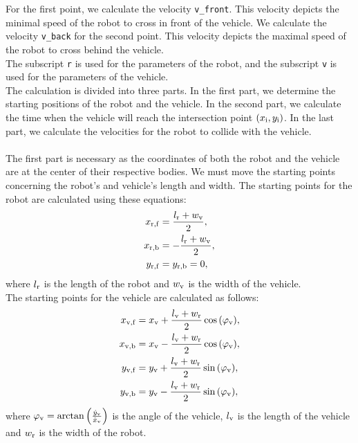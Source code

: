         \noindent For the first point, we calculate the velocity \texttt{v\_front}. This velocity depicts the minimal speed of the robot to cross in front of the vehicle. We calculate the velocity \texttt{v\_back} for the second point. This velocity depicts the maximal speed of the robot to cross behind the vehicle.\\
        The subscript \texttt{r} is used for the parameters of the robot, and the subscript \texttt{v} is used for the parameters of the vehicle.\\
        The calculation is divided into three parts. In the first part, we determine the starting positions of the robot and the vehicle. In the second part, we calculate the time when the vehicle will reach the intersection point $(x_{\rm{i}}, y_{\rm{i}})$. In the last part, we calculate the velocities for the robot to collide with the vehicle.\\\\
        The first part is necessary as the coordinates of both the robot and the vehicle are at the center of their respective bodies. We must move the starting points concerning the robot's and vehicle's length and width. The starting points for the robot are calculated using these equations:
        \begin{align}
            x_{\rm{r,f}} &= \frac{l_{\rm{r}}+w_{\rm{v}}}{2},\\
            x_{\rm{r,b}} &= -\frac{l_{\rm{r}}+w_{\rm{v}}}{2},\\
            y_{\rm{r,f}} &= y_{\rm{r,b}} = 0,
        \end{align}
        where $l_{\rm{r}}$ is the length of the robot and $w_{\rm{v}}$ is the width of the vehicle.\\
        The starting points for the vehicle are calculated as follows:
        \begin{align}
            x_{\rm{v,f}} &= x_{\rm{v}} + \frac{l_{\rm{v}}+w_{\rm{r}}}{2}\cos{(\varphi_{\rm{v}})},\\
            x_{\rm{v,b}} &= x_{\rm{v}} - \frac{l_{\rm{v}}+w_{\rm{r}}}{2}\cos{(\varphi_{\rm{v}})},\\
            y_{\rm{v,f}} &= y_{\rm{v}} + \frac{l_{\rm{v}}+w_{\rm{r}}}{2}\sin{(\varphi_{\rm{v}})},\\
            y_{\rm{v,b}} &= y_{\rm{v}} - \frac{l_{\rm{v}}+w_{\rm{r}}}{2}\sin{(\varphi_{\rm{v}})},
        \end{align}
        where $\varphi_{\rm{v}} = \arctan{\left(\frac{\dot{y}_{\rm{v}}}{\dot{x}_{\rm{v}}}\right)}$ is the angle of the vehicle, $l_{\rm{v}}$ is the length of the vehicle and $w_{\rm{r}}$ is the width of the robot.\\
